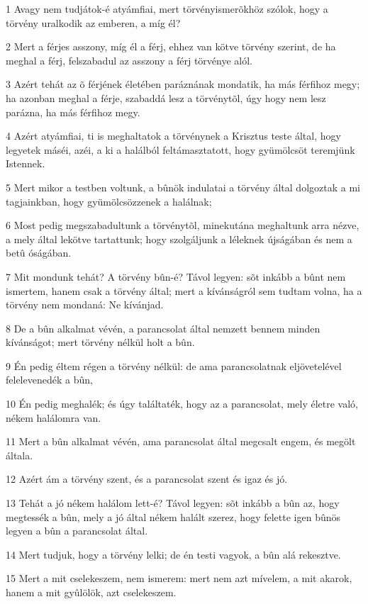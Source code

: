 \par 1 Avagy nem tudjátok-é atyámfiai, mert törvényismerõkhöz szólok, hogy a törvény uralkodik az emberen, a míg él?
\par 2 Mert a férjes asszony, míg él a férj, ehhez van kötve törvény szerint, de ha meghal a férj, felszabadul az asszony a férj törvénye alól.
\par 3 Azért tehát az õ férjének életében paráznának mondatik, ha más férfihoz megy; ha azonban meghal a férje, szabaddá lesz a törvénytõl, úgy hogy nem lesz parázna, ha más férfihoz megy.
\par 4 Azért atyámfiai, ti is meghaltatok a törvénynek a Krisztus teste által, hogy legyetek máséi, azéi, a ki a halálból feltámasztatott, hogy gyümölcsöt teremjünk Istennek.
\par 5 Mert mikor a testben voltunk, a bûnök indulatai a törvény által dolgoztak a mi tagjainkban, hogy gyümölcsözzenek a halálnak;
\par 6 Most pedig megszabadultunk a törvénytõl, minekutána meghaltunk arra nézve, a mely által lekötve tartattunk; hogy szolgáljunk a léleknek újságában és nem a betû óságában.
\par 7 Mit mondunk tehát? A törvény bûn-é? Távol legyen: sõt inkább a bûnt nem ismertem, hanem csak a törvény által; mert a kívánságról sem tudtam volna, ha a törvény nem mondaná: Ne kívánjad.
\par 8 De a bûn alkalmat vévén, a parancsolat által nemzett bennem minden kívánságot; mert törvény nélkül holt a bûn.
\par 9 Én pedig éltem régen a törvény nélkül: de ama parancsolatnak eljövetelével felelevenedék a bûn,
\par 10 Én pedig meghalék; és úgy találtaték, hogy az a parancsolat, mely életre való, nékem halálomra van.
\par 11 Mert a bûn alkalmat vévén, ama parancsolat által megcsalt engem, és megölt általa.
\par 12 Azért ám a törvény szent, és a parancsolat szent és igaz és jó.
\par 13 Tehát a jó nékem halálom lett-é? Távol legyen: sõt inkább a bûn az, hogy megtessék a bûn, mely a jó által nékem halált szerez, hogy felette igen bûnös legyen a bûn a parancsolat által.
\par 14 Mert tudjuk, hogy a törvény lelki; de én testi vagyok, a bûn alá rekesztve.
\par 15 Mert a mit cselekeszem, nem ismerem: mert nem azt mívelem, a mit akarok, hanem a mit gyûlölök, azt cselekeszem.
